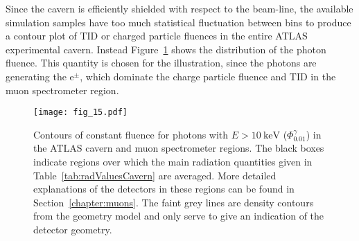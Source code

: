 \documentclass[cernpreprint, atlasdraft=false, UKenglish,british,orcidlogo, texmf, orcidlogo]{atlasdoc}
\begin{document}
Since the cavern is efficiently shielded with respect to the beam-line, the available simulation samples have too much
statistical fluctuation between bins to produce a contour plot of \gls{TID} or charged particle fluences in the entire ATLAS
experimental cavern. Instead Figure~\ref{fig:radLevelsCavern} shows the distribution of the photon fluence.
This quantity is chosen for the illustration, since the photons are generating the e$^{\pm}$, which dominate the
charge particle fluence and TID in the muon spectrometer region.
 
\begin{figure}
\begin{center}
\texttt{[image: fig\_15.pdf]}
\end{center}
\caption{Contours of constant fluence for photons with $E>\SI{10}{\keV}$ ($\Phi^\gamma_\textrm{0.01}$) in the ATLAS cavern and muon spectrometer regions.
The black boxes indicate regions over which the main radiation quantities given in Table~\ref{tab:radValuesCavern} are averaged. More detailed explanations of the
detectors in these regions can be found in Section~\ref{chapter:muons}.
The faint grey lines are density contours from the  geometry model and only serve to give an indication of the detector geometry.
\label{fig:radLevelsCavern}
}
\begin{center}


\end{center}
\end{figure}
\end{document}
